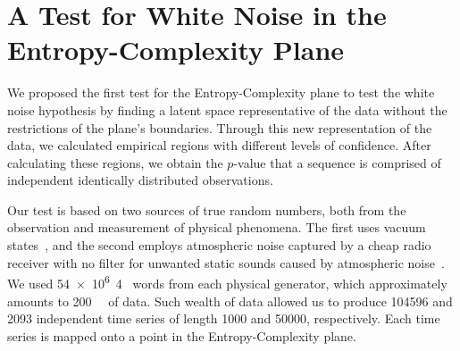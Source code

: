 \documentclass[a4,11pt]{pssbmac}
\begin{document}
\section{A Test for White Noise in the Entropy-Complexity Plane}\label{HC-PCA}

We proposed the first test for the Entropy-Complexity plane to test the white noise hypothesis by finding a latent space representative of the data without the restrictions of the plane's boundaries.
Through this new representation of the data, we calculated empirical regions with different levels of confidence.
After calculating these regions, we obtain the $p$-value that a sequence is comprised of independent identically distributed observations.

Our test is based on two sources of true random numbers, both from the observation and measurement of physical phenomena.
The first uses vacuum states~\cite{RNGVacuumStates}, and the second employs atmospheric noise captured by a cheap radio receiver with no filter for unwanted static sounds caused by atmospheric noise~\cite{RandomOrg}.
We used \SI{54e6}{4\byte} words from each physical generator, which approximately amounts to \SI{200}{\mega\byte} of data.
Such wealth of data allowed us to produce \num{104596} and \num{2093} independent time series of length \num{1000} and \num{50000}, respectively.
Each time series is mapped onto a point in the Entropy-Complexity plane.
\end{document}
